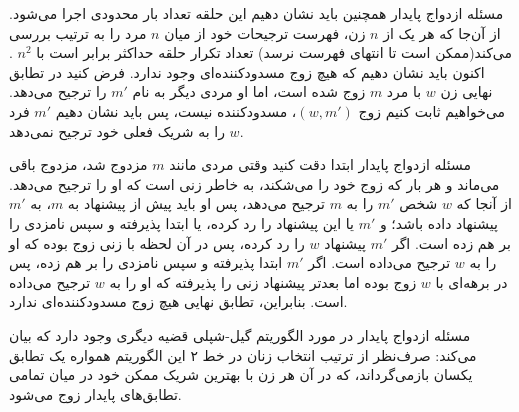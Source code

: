 \begin{itemframe}{مسئله ازدواج پایدار}
\itm
همچنین باید نشان دهیم این حلقه‌ تعداد بار محدودی اجرا می‌شود.
 از آن‌جا که هر یک از $n$ زن، فهرست ترجیحات خود از میان $n$ مرد را به ترتیب بررسی می‌کند‌(ممکن است تا انتهای فهرست نرسد) تعداد تکرار حلقه حداکثر برابر است با
$n^2$
.
\itm
اکنون باید نشان دهیم که هیچ زوج مسدودکننده‌ای وجود ندارد.
\itm
فرض کنید در تطابق نهایی زن $w$ با مرد $m$ زوج شده است، اما او مردی دیگر به نام $m'$ را ترجیح می‌دهد.
می‌خواهیم ثابت کنیم زوج $(w, m')$، مسدودکننده نیست، پس باید نشان دهیم $m'$ فرد $w$ را به شریک فعلی خود ترجیح نمی‌دهد.
\end{itemframe}


\begin{itemframe}{مسئله ازدواج پایدار}
\itm
ابتدا دقت کنید وقتی مردی مانند $m$ مزدوج شد، مزدوج باقی می‌ماند و هر بار که زوج خود را می‌شکند، به خاطر زنی است که او را ترجیح می‌دهد.
\itm
از آنجا که $w$ شخص $m'$ را به $m$ ترجیح می‌دهد، پس او باید پیش از پیشنهاد به $m$، به $m'$ پیشنهاد داده باشد؛ و $m'$ یا این پیشنهاد را رد کرده، یا ابتدا پذیرفته و سپس نامزدی را بر هم زده است.
\itm
اگر $m'$ پیشنهاد $w$ را رد کرده، پس در آن لحظه با زنی زوج بوده که او را به $w$ ترجیح می‌داده است.
 اگر $m'$ ابتدا پذیرفته و سپس نامزدی را بر هم زده، پس در برهه‌ای با $w$ زوج بوده اما بعدتر پیشنهاد زنی را پذیرفته که او را به $w$ ترجیح می‌داده است.
\itm
بنابراین، تطابق نهایی هیچ زوج مسدودکننده‌ای ندارد.
\end{itemframe}


\begin{itemframe}{مسئله ازدواج پایدار}
\itm
در مورد الگوریتم گیل-شپلی قضیه دیگری وجود دارد که بیان می‌کند: صرف‌نظر از ترتیب انتخاب زنان در خط ۲ این الگوریتم همواره یک تطابق یکسان بازمی‌گرداند، که در آن هر زن با بهترین شریک ممکن خود در میان تمامی تطابق‌های پایدار زوج می‌شود.

\end{itemframe}